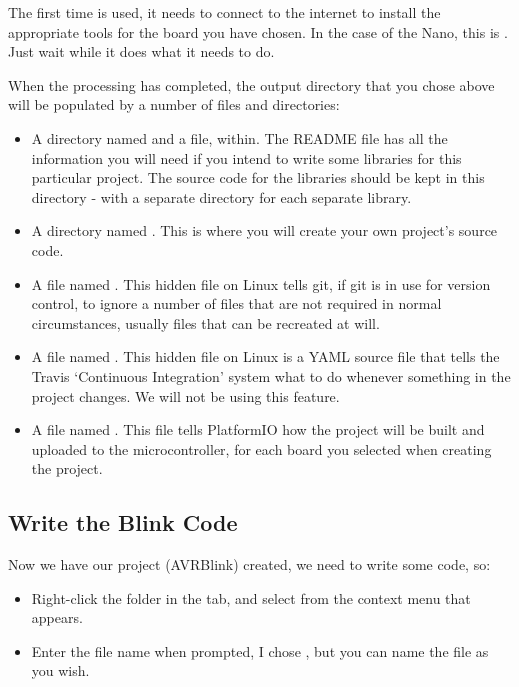The first time  is used, it needs to connect to the internet to install the appropriate tools for the board you have chosen. In the case of the Nano, this is . Just wait while it does what it needs to do.

When the processing has completed, the output directory that you chose
above will be populated by a number of files and directories:

\begin{itemize}
\item
  A directory named  and a file,  within.   The README file has all the information you will need if you intend to   write some libraries for this particular project. The source code for   the libraries should be kept in this directory - with a separate directory for each separate library.
\item
  A directory named . This is where you will create your own   project's source code.
\item
  A file named . This hidden file on Linux tells git, if git is in use for   version control, to ignore a number of files that are not required in   normal circumstances, usually files that can be recreated at will.
\item
  A file named . This hidden file on Linux is a YAML source file that   tells the Travis `Continuous Integration' system what to do whenever   something in the project changes. We will not be using this feature.
\item
  A file named . This file tells PlatformIO how the   project will be built and uploaded to the microcontroller, for each   board you selected when creating the project. 
\end{itemize}

\subsection{Write the Blink Code}\label{write-the-blink-code}

Now we have our project (AVRBlink) created, we need to write some code, so:

\begin{itemize}
\item
  Right-click the  folder in the  tab, and select    from the context menu that appears.
\item
  Enter the file name when prompted, I chose , but you can name   the file as you wish.
\end{itemize}

